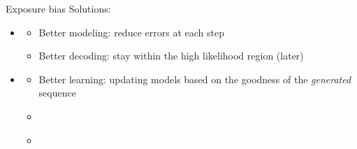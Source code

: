 \documentclass[usenames,dvipsnames,notes,11pt,aspectratio=169,hyperref={colorlinks=true, linkcolor=blue}]{beamer}
\begin{document}
\begin{frame}
    {Exposure bias}
    Solutions:\\
    \begin{itemize}
        \item {}
            \begin{itemize}
                \item Better modeling: reduce errors at each step
                \item Better decoding: stay within the high likelihood region (later)
            \end{itemize}
        \pause
    \item {} %
            \begin{itemize}
                \item Better learning: updating models based on the goodness of the {\em generated} sequence
                    \pause
                \item[] {\em{}}
                \item[] {\em{}}
            \end{itemize}
    \end{itemize}
\end{frame}
\end{document}
